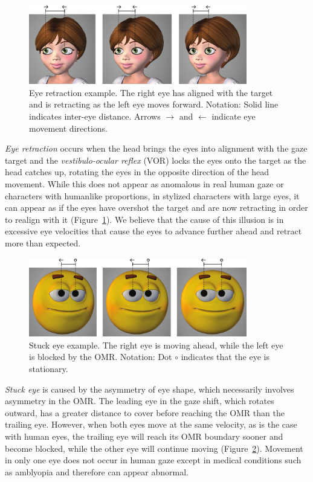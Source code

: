 \begin{figure}
\centering
\includegraphics[width=0.85\textwidth]{stylizedgaze/Figures/EyeRetractionExample-small.pdf}
\caption{Eye retraction example. The right eye has aligned with the target and is retracting as the left eye moves forward. Notation: Solid line indicates inter-eye distance. Arrows $\rightarrow$ and $\leftarrow$ indicate eye movement directions.}
\label{fig:EyeRetractionExample}
\end{figure}

\emph{Eye retraction} occurs when the head brings the eyes into alignment with the gaze target and the \textit{vestibulo-ocular reflex} (VOR) locks the eyes onto the target as the head catches up, rotating the eyes in the opposite direction of the head movement. While this does not appear as anomalous in real human gaze or characters with humanlike proportions, in stylized characters with large eyes, it can appear as if the eyes have overshot the target and are now retracting in order to realign with it (Figure~\ref{fig:EyeRetractionExample}). We believe that the cause of this illusion is in excessive eye velocities that cause the eyes to advance further ahead and retract more than expected.

\begin{figure}
\centering
\includegraphics[width=0.85\textwidth]{stylizedgaze/Figures/StuckEyeExample-small.pdf}
\caption{Stuck eye example. The right eye is moving ahead, while the left eye is blocked by the OMR. Notation: Dot $\circ$ indicates that the eye is stationary.}
\label{fig:StuckEyeExample}
\end{figure}

\emph{Stuck eye} is caused by the asymmetry of eye shape, which necessarily involves asymmetry in the OMR. The leading eye in the gaze shift, which rotates outward, has a greater distance to cover before reaching the OMR than the trailing eye. However, when both eyes move at the same velocity, as is the case with human eyes, the trailing eye will reach its OMR boundary sooner and become blocked, while the other eye will continue moving (Figure~\ref{fig:StuckEyeExample}). Movement in only one eye does not occur in human gaze except in medical conditions such as amblyopia and therefore can appear abnormal.

